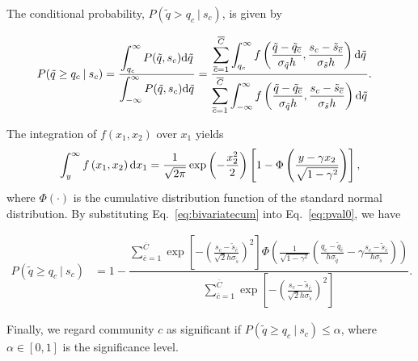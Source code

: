 \documentclass[fleqn,10pt]{wlscirep}
\newcommand\given[1][]{\:#1\vert\:}
\begin{document}
The conditional probability, $P(\tilde q > q_c \given s_c)$, is given by 
\begin{linenomath}
\begin{align}
    \label{eq:pval0}
    P(\tilde q \geq q_c \given s_c) &=  \dfrac{\displaystyle \int ^{\infty} _{q_c} P( \tilde q, s_c ) {\rm d}\tilde q}{\displaystyle \int ^{\infty} _{-\infty} P(\tilde q, s_c)  {\rm d}\tilde q}
    =  \dfrac{\displaystyle \sum\limits_{\overline{c}=1}^{\overline{C}} \int ^{\infty} _{q_c} f\left( \frac{\tilde q - \tilde q_{\overline{c}}}{\sigma_{\tilde q}h}, \frac{ s_c - \tilde s _{{\overline{c}}}}{\sigma_{\tilde s}h} \right) {\rm d}\tilde q}{\displaystyle \sum\limits_{{\overline{c}}=1}^{\overline{C}} \int ^{\infty} _{-\infty} f\left( \frac{\tilde q - \tilde q_{{\overline{c}}}}{\sigma_{\tilde q}h}, \frac{s_c - \tilde s _{{\overline{c}}}}{\sigma_{\tilde s}h} \right) {\rm d}\tilde q}.    
\end{align}
\end{linenomath}
The integration of $f(x_1, x_2)$ over $x_1$ yields  
\begin{align}
    \label{eq:bivariatecum}
    \int_{y} ^{\infty} f\left( x_1 , x_2 \right){\rm d}x_1 = \frac{1}{\sqrt{2\pi }}\exp\left(-\frac{x_2 ^2}{2}\right)\left[ 1  -\Phi\left( \frac{ y -\gamma x_2 }{\sqrt{1-\gamma^2}} \right)\right],
\end{align}
where $\Phi\left( \cdot \right)$ is the cumulative distribution function of the standard normal distribution.
By substituting Eq.~\eqref{eq:bivariatecum} into Eq.~\eqref{eq:pval0}, we have 
\begin{linenomath}
\begin{align}
    \label{eq:pval}
    P(\tilde q \geq q_c \given s_c) &= 1 - \dfrac{
                    \displaystyle \sum\limits_{{\overline{c}}=1}^{\overline{C}}{ 
                        \exp\left[ -\left(\frac{s_c -  \tilde s_{{\overline{c}}} }{\sqrt{2}h\sigma_{\tilde s}}\right)^2\right]}
                    \Phi\left(
            \frac{1}{\sqrt{1-\gamma^2}} \left( \frac{q_c  - \tilde q_{{\overline{c}}}}{h\sigma_{\tilde q}} - \gamma \frac{s_c  - \tilde s_{{\overline{c}}}}{h\sigma_{\tilde s}}\right) 
            \right)
                    }{
                    \displaystyle \sum\limits_{{\overline{c}}=1}^{\overline{C}}{\exp\left[ -\left(\frac{s_c -  \tilde s_{{\overline{c}}} }{\sqrt{2}h\sigma_{\tilde s}}\right)^2\right]}
                    }. 
\end{align}
\end{linenomath}
Finally, we regard community $c$ as significant if $P(\tilde q \geq q_c \given s_c) \leq \alpha$, where $\alpha \in [0,1]$ is the significance level.
\end{document}
